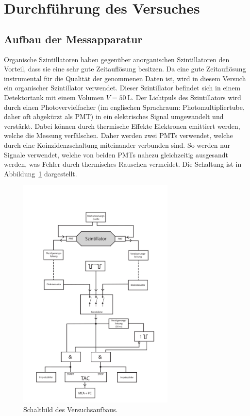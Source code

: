 \section{Durchführung des Versuches}
\label{sec:Durchführung}
\subsection{Aufbau der Messapparatur}
\label{subsec:Aufbau}
Organische Szintillatoren haben gegenüber anorganischen Szintillatoren den Vorteil, dass sie eine sehr
gute Zeitauflösung besitzen. Da eine gute Zeitauflösung instrumental für die Qualität der genommenen
Daten ist, wird in diesem Versuch ein organischer Szintillator verwendet.
Dieser Szintillator befindet sich in einem Detektortank mit einem Volumen $V = \SI{50}{\liter}$.
Der Lichtpuls des Szintillators wird durch einen Photovervielfacher (im englischen Sprachraum: Photomultipliertube,
daher oft abgekürzt als PMT) in ein elektrisches Signal umgewandelt und verstärkt.
Dabei können durch thermische Effekte Elektronen emittiert werden, welche die
Messung verfälschen. Daher werden zwei PMTs verwendet, welche durch eine
Koinzidenzschaltung miteinander verbunden sind. So werden nur Signale verwendet, welche
von beiden PMTs nahezu gleichzeitig ausgesandt werden, was Fehler durch thermisches
Rauschen vermeidet.
Die Schaltung ist in Abbildung~\ref{fig:Schaltbild} dargestellt.
\begin{figure}[H]
  \centering
    \includegraphics[width=0.7\textwidth]{pictures/Schaltbild.png}
    \caption{Schaltbild des Versuchsaufbaus. \cite{Versuchsbeschreibung}}
    \label{fig:Schaltbild}
\end{figure}
